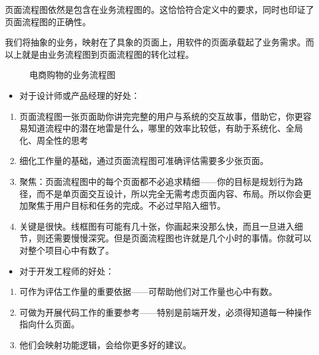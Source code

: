 \documentclass[letterpaper,11pt,english]{sphinxmanual}
\begin{document}
页面流程图依然是包含在业务流程图的。这恰恰符合定义中的要求，同时也印证了页面流程图的正确性。

我们将抽象的业务，映射在了具象的页面上，用软件的页面承载起了业务需求。而以上就是由业务流程图到页面流程图的转化过程。

\begin{figure}[H]
\centering
\capstart

\noindent{}
\caption{电商购物的业务流程图}\label{\detokenize{chapter_skill/flow_chart:id18}}\end{figure}
\begin{itemize}
\item {} 
对于设计师或产品经理的好处：

\end{itemize}
\begin{enumerate}
%
\item {} 
页面流程图一张页面助你讲完完整的用户与系统的交互故事，借助它，你更容易知道流程中的潜在地雷是什么，哪里的效率比较低，有助于系统化、全局化、周全性的思考

\item {} 
细化工作量的基础，通过页面流程图可准确评估需要多少张页面。

\item {} 
聚焦：页面流程图中的每个页面都不必追求精细——你的目标是规划行为路径，而不是单页面交互设计，所以完全无需考虑页面内容、布局。所以你会更加聚焦于用户目标和任务的完成。不必过早陷入细节。

\item {} 
关键是很快。线框图有可能有几十张，你画起来没那么快，而且一旦进入细节，则还需要慢慢深究。但是页面流程图也许就是几个小时的事情。你就可以对整个项目心中有数了。

\end{enumerate}
\begin{itemize}
\item {} 
对于开发工程师的好处：

\end{itemize}
\begin{enumerate}
%
\item {} 
可作为评估工作量的重要依据——可帮助他们对工作量也心中有数。

\item {} 
可做为开展代码工作的重要参考——特别是前端开发，必须得知道每一种操作指向什么页面。

\item {} 
他们会映射功能逻辑，会给你更多好的建议。

\end{enumerate}
\end{document}
